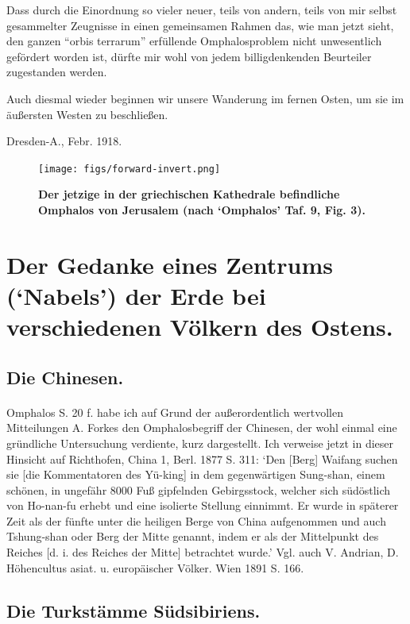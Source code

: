 \documentclass[a4paper, 11pt, oneside]{article}
\begin{document}
Dass durch die Einordnung so vieler neuer, teils von andern, teils von mir selbst gesammelter Zeugnisse in einen gemeinsamen Rahmen das, wie man jetzt sieht, den ganzen "`orbis terrarum"' erfüllende Omphalosproblem nicht unwesentlich gefördert worden ist, dürfte mir wohl von jedem billigdenkenden Beurteiler zugestanden werden.

Auch diesmal wieder beginnen wir unsere Wanderung im fernen Osten, um sie im äußersten Westen zu beschließen.

Dresden-A., Febr. 1918.
\clearpage
\vspace*{\fill}
\begin{figure}[H]
\centering
\texttt{[image: figs/forward-invert.png]}
\caption*{\bfseries Der jetzige in der griechischen Kathedrale befindliche Omphalos von Jerusalem (nach `Omphalos' Taf. 9, Fig. 3).}
\end{figure}
\vspace*{\fill}
\clearpage
\section{Der Gedanke eines Zentrums (`Nabels') der Erde bei verschiedenen Völkern des Ostens.}
\subsection{Die Chinesen.}
\paragraph{}
Omphalos S. 20 f. habe ich auf Grund der außerordentlich wertvollen Mitteilungen A. Forkes den Omphalosbegriff der Chinesen, der wohl einmal eine gründliche Untersuchung verdiente, kurz dargestellt. Ich verweise jetzt in dieser Hinsicht auf Richthofen, China 1, Berl. 1877 S. 311: `Den [Berg] Waifang suchen sie [die Kommentatoren des Yü-king] in dem gegenwärtigen Sung-shan, einem schönen, in ungefähr 8000 Fuß gipfelnden Gebirgsstock, welcher sich südöstlich von Ho-nan-fu erhebt und eine isolierte Stellung einnimmt. Er wurde in späterer Zeit als der fünfte unter die heiligen Berge von China aufgenommen und auch Tshung-shan oder Berg der Mitte genannt, indem er als der Mittelpunkt des Reiches [d. i. des Reiches der Mitte] betrachtet wurde.' Vgl. auch V. Andrian, D. Höhencultus asiat. u. europäischer Völker. Wien 1891 S. 166.

\subsection{Die Turkstämme Südsibiriens.}
\end{document}
